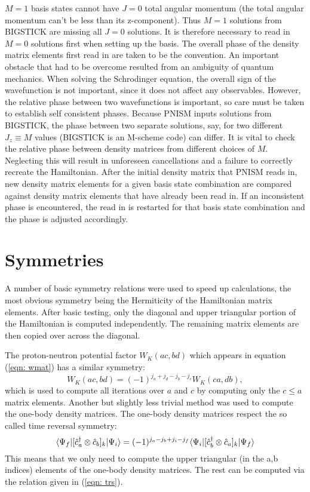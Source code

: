 $M=1$ basis states cannot have $J=0$ total angular momentum (the total angular momentum
can't be less than its z-component). Thus $M=1$ solutions from BIGSTICK are missing
all $J=0$ solutions. It is therefore necessary to read in $M=0$ solutions first
when setting up the basis. The overall phase of the density matrix elements first
read in are taken to be the convention. 
An important obstacle that had to be overcome resulted from an ambiguity of quantum
mechanics. When solving the Schrodinger equation, the overall sign of the wavefunction
is not important, since it does not affect any observables. However, the relative 
phase between two wavefunctions is important, so 
care must be taken to establish self consistent phases. Because PNISM inputs solutions
from BIGSTICK, the phase between two separate solutions, say, for two different
$J_z \equiv M$ values (BIGSTICK is an M-scheme code) can differ. It is vital to check 
the relative phase between density matrices from different choices of $M$. Neglecting 
this will result in unforeseen cancellations and a failure to correctly recreate the 
Hamiltonian. After the initial density matrix that PNISM reads in, new density matrix 
elements for a given basis state combination are compared against density 
matrix elements that have already been read in. If an inconsistent phase is 
encountered, the read in is restarted for that basis state combination and the 
phase is adjusted accordingly.

\section{Symmetries}
A number of basic symmetry relations were used to speed up calculations, the most
obvious symmetry being the Hermiticity of the Hamiltonian matrix elements. After
basic testing, only the diagonal and upper triangular portion of the Hamiltonian 
is computed independently. The remaining matrix elements are then copied over
across the diagonal. 

The proton-neutron potential factor $W_{K}(ac,bd)$ 
which appears in equation (\ref{eqn: wmat}) has a similar symmetry:
\begin{equation}
    W_K(ac,bd) = (-1)^{j_a+j_d-j_b-j_c}W_K(ca,db),
\end{equation}
which is used to compute all iterations over $a$ and $c$ by computing
only the $c\leq a$ matrix elements. Another but slightly less trivial 
method was used to compute the one-body 
density matrices. The one-body density matrices respect the so called
time reversal symmetry:
\begin{equation}\label{eqn: trs}
     \langle \Psi_f| [\hat{c}^\dagger_a\otimes \hat{c}_b]_k |\Psi_i\rangle = 
        (-1)^{j_a-j_b+j_i-j_f}\langle \Psi_i|
            [\hat{c}^\dagger_b\otimes \hat{c}_a]_k |\Psi_f\rangle
\end{equation}
This means that we only need to compute the upper triangular (in the a,b indices)
elements of the one-body density matrices. The rest can be computed via the relation
given in (\ref{eqn: trs}). 

